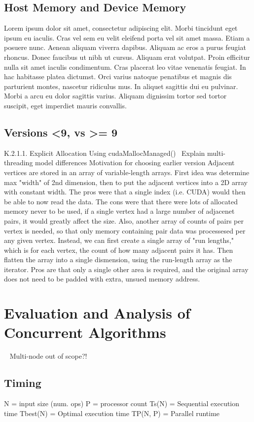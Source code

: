 \subsection{Host Memory and Device Memory}
Lorem ipsum dolor sit amet, consectetur adipiscing elit. Morbi tincidunt eget
ipsum eu iaculis. Cras vel sem eu velit eleifend porta vel sit amet massa. Etiam
a posuere nunc. Aenean aliquam viverra dapibus. Aliquam ac eros a purus feugiat
rhoncus. Donec faucibus ut nibh ut cursus. Aliquam erat volutpat. Proin efficitur
nulla sit amet iaculis condimentum. Cras placerat leo vitae venenatis feugiat. In
hac habitasse platea dictumst. Orci varius natoque penatibus et magnis dis
parturient montes, nascetur ridiculus mus. In aliquet sagittis dui eu pulvinar.
Morbi a arcu eu dolor sagittis varius. Aliquam dignissim tortor sed tortor
suscipit, eget imperdiet mauris convallis.~\cite[p.~00]{todoCitation}\todoCitation
%
\subsection{Versions <9, vs >= 9}
K.2.1.1. Explicit Allocation Using cudaMallocManaged()~\cite[p.~272]{CUDA18}
Explain multi-threading model differences Motivation for choosing earlier
version Adjacent vertices are stored in an array of variable-length arrays.
First idea was determine max "width" of 2nd dimension, then to put the adjacent
vertices into a 2D array with constant width. The pros were that a single index
(i.e. CUDA) would then be able to now read the data.  The cons were that there
were lots of allocated memory never to be used, if a single vertex had a large
number of adjacenet pairs, it would greatly affect the size. Also, another
array of counts of pairs per vertex is needed, so that only memory containing
pair data was processesed per any given vertex. Instead, we can first create a
single array of "run lengths," which is for each vertex, the count of how many
adjacent pairs it has. Then flatten the array into a single dismension, using
the run-length array as the iterator. Pros are that only a single other area is
required, and the original array does not need to be padded with extra, unsued
memory address.
%
%
%
\section{Evaluation and Analysis of Concurrent Algorithms}~\cite[p.~330]{Lang17}
Multi-node out of scope?!
%
\subsection{Timing}
	N = input size (num. ops)
	P = processor count
	Ts(N) = Sequential execution time
	Tbest(N) = Optimal execution time
	TP(N, P) = Parallel runtime
%

